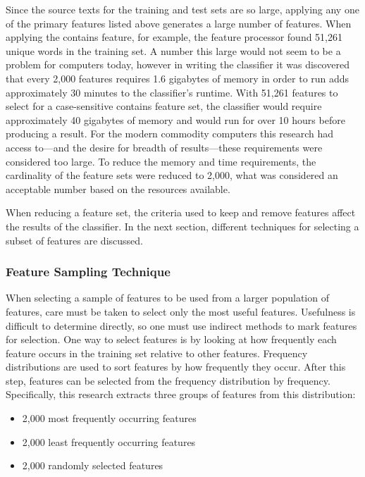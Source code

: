 Since the source texts for the training and test sets are so large, applying any one of the primary features listed above generates a large number of features.
When applying the contains feature, for example, the feature processor found 51,261 unique words in the training set.
A number this large would not seem to be a problem for computers today, however in writing the classifier it was discovered that every 2,000 features requires 1.6 gigabytes of memory in order to run adds approximately 30 minutes to the classifier's runtime.
With 51,261 features to select for a case-sensitive contains feature set, the classifier would require approximately 40 gigabytes of memory and would run for over 10 hours before producing a result.
For the modern commodity computers this research had access to---and the desire for breadth of results---these requirements were considered too large.
To reduce the memory and time requirements, the cardinality of the feature sets were reduced to 2,000, what was considered an acceptable number based on the resources available. 

When reducing a feature set, the criteria used to keep and remove features affect the results of the classifier.
In the next section, different techniques for selecting a subset of features are discussed.

\subsubsection{Feature Sampling Technique}

When selecting a sample of features to be used from a larger population of features, care must be taken to select only the most useful features.
Usefulness is difficult to determine directly, so one must use indirect methods to mark features for selection.
One way to select features is by looking at how frequently each feature occurs in the training set relative to other features.
Frequency distributions are used to sort features by how frequently they occur.
After this step, features can be selected from the frequency distribution by frequency.
Specifically, this research extracts three groups of features from this distribution:

\begin{itemize}
\item 2,000 most frequently occurring features
\item 2,000 least frequently occurring features
\item 2,000 randomly selected features
\end{itemize}

